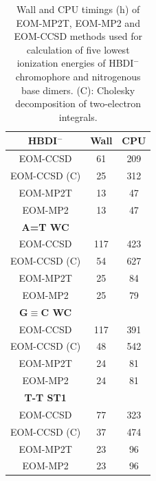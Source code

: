 \documentclass[12pt,nofootinbib]{revtex4}
\begin{document}
\begin{table}[!htbp]
  \centering
  \caption{Wall and CPU timings (h) of EOM-MP2T, EOM-MP2 and EOM-CCSD methods used for calculation of five lowest ionization energies of HBDI$^{-}$ chromophore and nitrogenous base dimers. (C): Cholesky decomposition of two-electron integrals.}
    \begin{tabular}{c|cc}
    \toprule
    \textbf{HBDI$^{-}$} & Wall  & CPU \\
    \hline
    EOM-CCSD & 61    & 209 \\
    EOM-CCSD (C)  & 25    & 312 \\
    EOM-MP2T & 13    & 47 \\
    EOM-MP2 & 13    & 47 \\
    \hline
    \textbf{A=T WC} &       &  \\
    \hline
    EOM-CCSD & 117   & 423 \\
    EOM-CCSD (C)  & 54    & 627 \\
    EOM-MP2T & 25    & 84 \\
    EOM-MP2 & 25    & 79 \\
    \hline
    \textbf{G$\equiv$C WC} &       &  \\
    \hline
    EOM-CCSD & 117   & 391 \\
    EOM-CCSD (C)  & 48    & 542 \\
    EOM-MP2T & 24    & 81 \\
    EOM-MP2 & 24    & 81 \\
    \hline
    \textbf{T-T ST1} &       &  \\
    \hline
    EOM-CCSD & 77    & 323 \\
    EOM-CCSD (C)  & 37    & 474 \\
    EOM-MP2T & 23    & 96 \\
    EOM-MP2 & 23    & 96 \\
    \hline\hline
    \end{tabular}%
  \label{tab:addlabel}%
\end{table}%

\clearpage
\end{document}

